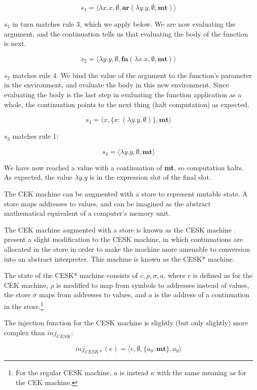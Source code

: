 \documentclass{article}
\begin{document}
$$ s_1 = \langle \lambda x.x, \emptyset, \textbf{ar}(\lambda y.y, \emptyset, \textbf{mt}) \rangle $$

$s_1$ in turn matches rule 3, which we apply below. We are now evaluating the argument, and the continuation tells us that evaluating the body of the function is next.

$$ s_2 = \langle \lambda y.y, \emptyset, \textbf{fn}(\lambda x.x, \emptyset, \textbf{mt}) \rangle $$

$s_2$ matches rule 4. We bind the value of the argument to the function's parameter in the environment, and evaluate the body in this new environment. Since evaluating the body is the last step in evaluating the function application as a whole, the continuation points to the next thing (halt computation) as expected.

$$ s_3 = \langle x, \{ x: (\lambda y.y, \emptyset) \}, \textbf{mt} \rangle $$

$s_3$ matches rule 1:

$$ s_4 = \langle \lambda y.y, \emptyset, \textbf{mt} \rangle $$

We have now reached a value with a continuation of \textbf{mt}, so computation halts. As expected, the value $\lambda y.y$ is in the expression slot of the final slot.

The CEK machine can be augmented with a store to represent mutable state. A store maps addresses to values, and can be imagined as the abstract mathematical equivalent of a computer's memory unit.

The CEK machine augmented with a store is known as the CESK machine \cite{cesk}. \cite{aam} present a slight modification to the CESK machine, in which continuations are allocated in the store in order to make the machine more amenable to conversion into an abstract interpreter. This machine is known as the CESK* machine.

The state of the CESK* machine consists of $c, \rho, \sigma, a$, where $c$ is defined as for the CEK machine, $\rho$ is modified to map from symbols to addresses instead of values, the store $\sigma$ maps from addresses to values, and $a$ is the address of a continuation in the store.\footnote{For the regular CESK machine, $a$ is instead $\kappa$ with the same meaning as for the CEK machine.}

The injection function for the CESK machine is slightly (but only slightly) more complex than $inj_{CESK}$:

$$ inj_{CESK*}(e) = \langle e, \emptyset, \{ a_0: \textbf{mt} \}, a_0 \rangle $$
\end{document}
